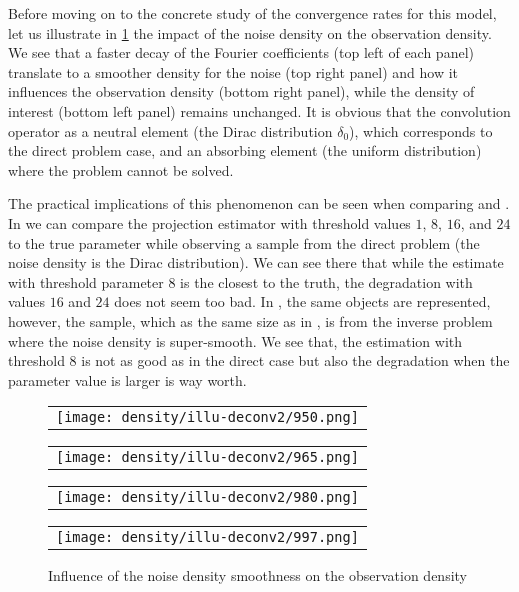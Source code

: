 Before moving on to the concrete study of the convergence rates for this model, let us illustrate in \ref{fig:myfig} the impact of the noise density on the observation density.
We see that a faster decay of the Fourier coefficients (top left of each panel) translate to a smoother density for the noise (top right panel) and how it influences the observation density (bottom right panel), while the density of interest (bottom left panel) remains unchanged.
It is obvious that the convolution operator as a neutral element (the Dirac distribution $\delta_{0}$), which corresponds to the direct problem case, and an absorbing element (the uniform distribution) where the problem cannot be solved.

The practical implications of this phenomenon can be seen when comparing  and .
In  we can compare the projection estimator with threshold values $1$, $8$, $16$, and $24$ to the true parameter while observing a sample from the direct problem (the noise density is the Dirac distribution).
We can see there that while the estimate with threshold parameter $8$ is the closest to the truth, the degradation with values $16$ and $24$ does not seem too bad.
In , the same objects are represented, however, the sample, which as the same size as in , is from the inverse problem where the noise density is super-smooth.
We see that, the estimation with threshold $8$ is not as good as in the direct case but also the degradation when the parameter value is larger is way worth.

\begin{figure}
  \centering
  \begin{tabular}{@{}c@{}}
    \texttt{[image: density/illu-deconv2/950.png]} \\[\abovecaptionskip]
  \end{tabular}
  \begin{tabular}{@{}c@{}}
    \texttt{[image: density/illu-deconv2/965.png]} \\[\abovecaptionskip]
  \end{tabular}

  \vspace{\floatsep}

  \begin{tabular}{@{}c@{}}
    \texttt{[image: density/illu-deconv2/980.png]} \\[\abovecaptionskip]
  \end{tabular}
  \begin{tabular}{@{}c@{}}
    \texttt{[image: density/illu-deconv2/997.png]} \\[\abovecaptionskip]
  \end{tabular}

  \caption{Influence of the noise density smoothness on the observation density}\label{fig:myfig}
\end{figure}

